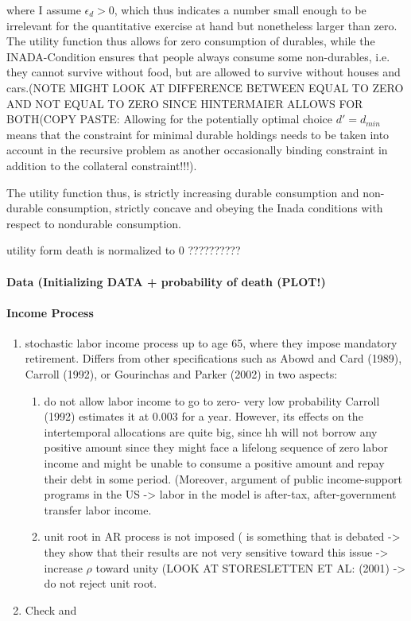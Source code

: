 \documentclass[a4paper,12pt]{article}
\begin{document}
where I assume $\epsilon_{d} > 0$, which thus indicates a number small enough to be irrelevant for the quantitative exercise at hand but nonetheless larger than zero. The utility function thus allows for zero consumption of durables, while the INADA-Condition ensures that people always consume some non-durables, i.e. they cannot survive without food, but are allowed to survive without houses and cars.(NOTE MIGHT LOOK AT DIFFERENCE BETWEEN EQUAL TO ZERO AND NOT EQUAL TO ZERO SINCE HINTERMAIER ALLOWS FOR BOTH(COPY PASTE: Allowing for the potentially optimal choice $d' = d_{min}$ means that the constraint for minimal durable holdings needs to be taken into account in the recursive problem as another occasionally binding constraint in addition to the collateral constraint!!!). 

The utility function thus, is strictly increasing durable consumption and non-durable consumption, strictly concave and obeying the Inada conditions with respect to nondurable consumption. 

\citep{FV&K2011} utility form death is normalized to 0 ??????????

\paragraph{Data (Initializing DATA + probability of death (PLOT!)}

\paragraph{Income Process}

\begin{enumerate}
\item \citep{FV&K2011} stochastic labor income process up to age 65, where they impose mandatory retirement. Differs from other specifications such as Abowd and Card (1989), Carroll (1992), or Gourinchas and Parker (2002) in two aspects: 
\begin{enumerate}
\item do not allow labor income to go to zero- very low probability Carroll (1992) estimates it at 0.003 for a year. However, its effects on the intertemporal allocations are quite big, since hh will not borrow any positive amount since they might face a lifelong sequence of zero labor income and might be unable to consume a positive amount and repay their debt in some period. (Moreover, argument of public income-support programs in the US -> labor in the model is after-tax, after-government transfer labor income.
\item unit root in AR process is not imposed  ( is something that is debated -> they show that their results are not very sensitive toward this issue -> increase $\rho$ toward unity (LOOK AT STORESLETTEN ET AL: (2001) -> do not reject unit root.
\end{enumerate} 
\item Check \cite{hintermaier2010} and \cite{hintermaier2011}
\end{enumerate}
\end{document}
